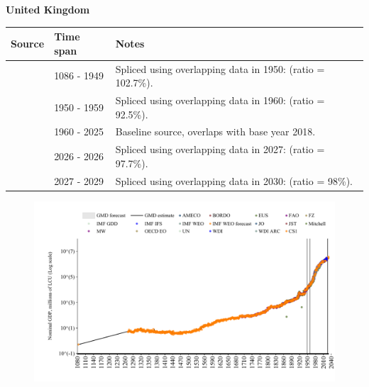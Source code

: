 \documentclass[12pt,a4paper,landscape]{article}
\begin{document}
\begin{adjustbox}{max totalsize={\paperwidth}{\paperheight},center}
\begin{minipage}[t][\textheight][t]{\textwidth}
\vspace*{0.5cm}
{}
\begin{center}
{\Large\bfseries United Kingdom}
\end{center}
\vspace{0.5cm}
\begin{table}[H]
\centering
\small
\begin{tabular}{|l|l|l|}
\hline
\textbf{Source} & \textbf{Time span} & \textbf{Notes} \\
\hline
\rowcolor{white}\cite{CS1_GBR}& 1086 - 1949 &Spliced using overlapping data in 1950: (ratio = 102.7\%).\\
\rowcolor{lightgray}\cite{IMF_GDD}& 1950 - 1959 &Spliced using overlapping data in 1960: (ratio = 92.5\%).\\
\rowcolor{white}\cite{OECD_EO}& 1960 - 2025 &Baseline source, overlaps with base year 2018.\\
\rowcolor{lightgray}\cite{AMECO}& 2026 - 2026 &Spliced using overlapping data in 2027: (ratio = 97.7\%).\\
\rowcolor{white}\cite{IMF_WEO_forecast}& 2027 - 2029 &Spliced using overlapping data in 2030: (ratio = 98\%).\\
\hline
\end{tabular}
\end{table}
\begin{figure}[H]
\centering
\includegraphics[width=\textwidth,height=0.6\textheight,keepaspectratio]{graphs/GBR_nGDP.pdf}
\end{figure}
\end{minipage}
\end{adjustbox}
\end{document}
